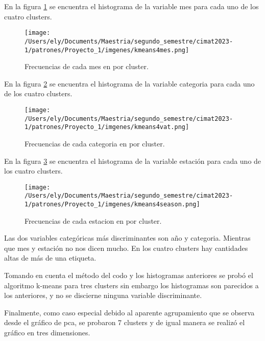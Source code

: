 \documentclass[letterpaper,spanish,reprint,nofootinbib,showkeys,aps]{revtex4-2}
\begin{document}
En la figura \ref{kmeans4mes} se encuentra el histograma de la variable mes para cada uno de los cuatro clusters.
\begin{figure} [H]
	\begin{center}
		\texttt{[image: /Users/ely/Documents/Maestria/segundo\_semestre/cimat2023-1/patrones/Proyecto\_1/imgenes/kmeans4mes.png]}
		\caption{Frecuencias de cada mes en por cluster. }
		\label{kmeans4mes} 
   \end{center} 
\end{figure} 

En la figura \ref{kmeans4vat} se encuentra el histograma de la variable categoria para cada uno de los cuatro clusters.

\begin{figure} [H]
	\begin{center}
		\texttt{[image: /Users/ely/Documents/Maestria/segundo\_semestre/cimat2023-1/patrones/Proyecto\_1/imgenes/kmeans4vat.png]}
		\caption{Frecuencias de cada categoria en por cluster. }
		\label{kmeans4vat} 
   \end{center} 
\end{figure} 

En la figura \ref{kmeans4season} se encuentra el histograma de la variable estación para cada uno de los cuatro clusters.

\begin{figure} [H]
	\begin{center}
		\texttt{[image: /Users/ely/Documents/Maestria/segundo\_semestre/cimat2023-1/patrones/Proyecto\_1/imgenes/kmeans4season.png]}
		\caption{Frecuencias de cada estacion en por cluster. }
		\label{kmeans4season} 
   \end{center} 
\end{figure} 



Las dos variables categóricas más discriminantes son año y categoria. Mientras que mes y estación no nos dicen mucho. En los cuatro clusters hay cantidades altas de más de una etiqueta.

Tomando en cuenta el método del codo y los histogramas anteriores se probó el algoritmo k-means para tres clusters sin embargo los histogramas son parecidos a los anteriores, y no se discierne ninguna variable discriminante.

Finalmente, como caso especial debido al aparente agrupamiento que se observa desde el gráfico de pca, se probaron 7 clusters y de igual manera se realizó el gráfico en tres dimensiones.
\end{document}
